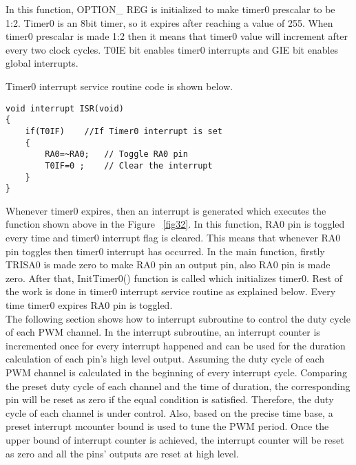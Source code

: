 \documentclass{report}
\begin{document}
In this function, OPTION\_ REG is initialized to make timer0 prescalar to be 1:2. Timer0 is an 8bit timer, so it expires after reaching a value of 255. When timer0 prescalar is made 1:2 then it means that timer0 value will increment after every two clock cycles. T0IE bit enables timer0 interrupts and GIE bit enables global interrupts.

Timer0 interrupt service routine code is shown below.\\
\begin{lstlisting}[caption= Timer0 Interrupt service routine,label=fig32]
void interrupt ISR(void)
{
	if(T0IF)	//If Timer0 interrupt is set
	{
		RA0=~RA0;	// Toggle RA0 pin
		T0IF=0 ; 	// Clear the interrupt
	}
}
\end{lstlisting}
Whenever timer0 expires, then an interrupt is generated which executes the function shown above in the Figure ~\ref{fig32}. In this function, RA0 pin is toggled every time and timer0 interrupt flag is cleared. This means that whenever RA0 pin toggles then timer0 interrupt has occurred.
In the main function, firstly TRISA0 is made zero to make RA0 pin an output pin, also RA0 pin is made zero. After that, InitTimer0() function is called which initializes timer0. Rest of the work is done in timer0 interrupt service routine as explained below. Every time timer0 expires RA0 pin is toggled.\\
The following section shows how to  interrupt subroutine to control the duty cycle of each PWM channel. In the interrupt subroutine, an interrupt counter is incremented once for every interrupt happened and can be used for the duration calculation of each pin’s high level output. Assuming the duty cycle of each PWM channel is calculated in the beginning of every interrupt cycle. Comparing the preset duty cycle of each channel and the time of duration, the corresponding pin will be reset as zero if the equal condition is satisfied. Therefore, the duty cycle of each channel is under control. Also, based on the precise time base, a preset interrupt mcounter bound is used to tune the PWM period. Once the upper bound of interrupt counter is achieved, the interrupt counter will be reset as zero and all the pins’ outputs are reset at high level.\\
\end{document}
